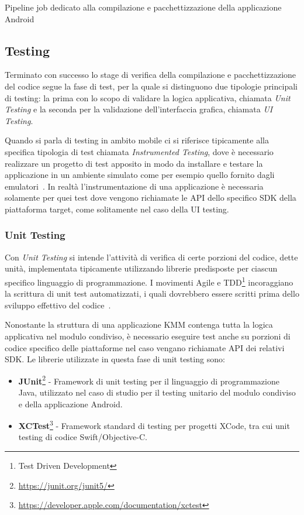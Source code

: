 \begin{listing}[H]
    \inputminted{yaml}{code/build-job.yaml}
    \caption{Pipeline job dedicato alla compilazione e pacchettizzazione della applicazione Android}
\end{listing}

\subsection{Testing}
Terminato con successo lo stage di verifica della compilazione e pacchettizzazione del codice segue la fase di test, per la quale si distinguono due tipologie principali di testing: la prima con lo scopo di validare la logica applicativa, chiamata \textit{Unit Testing} e la seconda per la validazione dell'interfaccia grafica, chiamata \textit{UI Testing}.

Quando si parla di testing in ambito mobile ci si riferisce tipicamente alla specifica tipologia di test chiamata \textit{Instrumented Testing}, dove è necessario realizzare un progetto di test apposito in modo da installare e testare la applicazione in un ambiente simulato come per esempio quello fornito dagli emulatori~\cite{darwin2011android}. In realtà l'instrumentazione di una applicazione è necessaria solamente per quei test dove vengono richiamate le API dello specifico SDK della piattaforma target, come solitamente nel caso della UI testing.

\subsubsection*{Unit Testing}
Con \textit{Unit Testing} si intende l’attività di verifica di certe porzioni del codice, dette unità, implementata tipicamente utilizzando librerie predisposte per ciascun specifico linguaggio di programmazione. I movimenti Agile e TDD\footnote{Test Driven Development} incoraggiano la scrittura di unit test automatizzati, i quali dovrebbero essere scritti prima dello sviluppo effettivo del codice~\cite{martin2017clean}.

Nonostante la struttura di una applicazione KMM contenga tutta la logica applicativa nel modulo condiviso, è necessario eseguire test anche su porzioni di codice specifico delle piattaforme nel caso vengano richiamate API dei relativi SDK. Le librerie utilizzate in questa fase di unit testing sono:

\begin{itemize}
    \item \textbf{JUnit}\footnote{\href{https://junit.org/junit5/}{https://junit.org/junit5/}} - Framework di unit testing per il linguaggio di programmazione Java, utilizzato nel caso di studio per il testing unitario del modulo condiviso e della applicazione Android.
    \item \textbf{XCTest}\footnote{\href{https://developer.apple.com/documentation/xctest}{https://developer.apple.com/documentation/xctest}} - Framework standard di testing per progetti XCode, tra cui unit testing di codice Swift/Objective-C.
\end{itemize}

